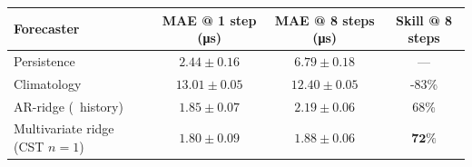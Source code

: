 \begin{tabular}{lccc}
  \toprule
  Forecaster & MAE @ 1 step (\si{\micro\second}) & MAE @ 8 steps (\si{\micro\second}) & Skill @ 8 steps \\
  \midrule
  Persistence                      & $2.44 \pm 0.16$ & $6.79 \pm 0.18$ & --- \\
  Climatology                      & $13.01 \pm 0.05$ & $12.40 \pm 0.05$ & -83\% \\
  AR-ridge (\T\ history)           & $1.85 \pm 0.07$ & $2.19 \pm 0.06$ & 68\% \\
  Multivariate ridge (CST $n{=}1$) & $\mathbf{1.80 \pm 0.09}$ & $\mathbf{1.88 \pm 0.06}$ & $\mathbf{72\%}$ \\
  \bottomrule
\end{tabular}
